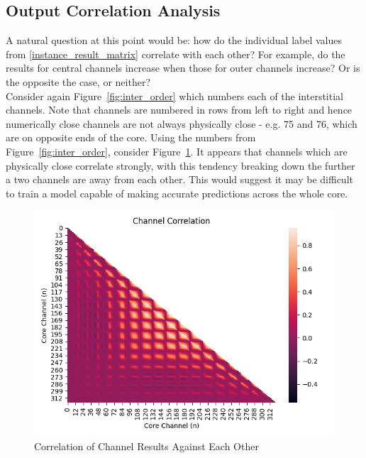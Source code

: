 \subsection{Output Correlation Analysis}

\noindent A natural question at this point would be: how do the individual label values from \ref{instance_result_matrix} correlate with each other? For example, do the results for central channels increase when those for outer channels increase? Or is the opposite the case, or neither? \\

\noindent Consider again Figure~\ref{fig:inter_order} which numbers each of the interstitial channels. Note that channels are numbered in rows from left to right and hence numerically close channels are not always physically close - e.g. 75 and 76, which are on opposite ends of the core. Using the numbers from Figure~\ref{fig:inter_order}, consider Figure~\ref{fig:channel_correlations}. It appears that channels which are physically close correlate strongly, with this tendency breaking down the further a two channels are away from each other. This would suggest it may be difficult to train a model capable of making accurate predictions across the whole core.
\\

\begin{figure}[h]
	\centering
	\includegraphics[scale=0.75]{Figures/channels_correlation.png}
	\caption{Correlation of Channel Results Against Each Other}
	\label{fig:channel_correlations}
\end{figure}

